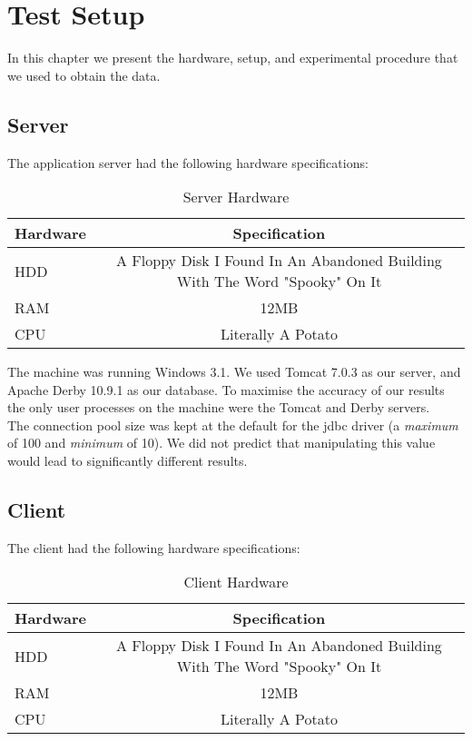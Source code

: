 \documentclass[11pt]{report}
\begin{document}
\chapter{Test Setup}
In this chapter we present the hardware, setup, and experimental procedure that we used to obtain the data.

\section{Server}

The application server had the following hardware specifications:
\begin{table}[htp]
\caption{Server Hardware}
\begin{center}
\begin{tabular}{l | c}
Hardware & Specification \\ \hline
HDD & A Floppy Disk I Found In An Abandoned Building With The Word "Spooky" On It \\
RAM & 12MB \\ 
CPU & Literally A Potato \\
\end{tabular}
\end{center}
\label{default}
\end{table}%

The machine was running Windows 3.1. We used Tomcat 7.0.3 as our server, and Apache Derby 10.9.1 as our database. To maximise the accuracy of our results the only user processes on the machine were the Tomcat and Derby servers. \\

The connection pool size was kept at the default for the jdbc driver (a \emph{maximum} of 100 and \emph{minimum} of 10). We did not predict that manipulating this value would lead to significantly different results.

\section{Client}

The client had the following hardware specifications:
\begin{table}[htp]
\caption{Client Hardware}
\begin{center}
\begin{tabular}{l | c}
Hardware & Specification \\ \hline
HDD & A Floppy Disk I Found In An Abandoned Building With The Word "Spooky" On It \\
RAM & 12MB \\ 
CPU & Literally A Potato \\
\end{tabular}
\end{center}
\label{default}
\end{table}%
\end{document}
